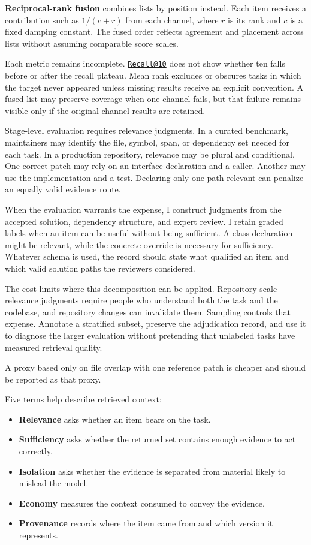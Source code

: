 \textbf{Reciprocal-rank fusion} combines lists by position instead. Each item receives a contribution such as \(1/(c+r)\) from each channel, where \(r\) is its rank and \(c\) is a fixed damping constant. The fused order reflects agreement and placement across lists without assuming comparable score scales.

Each metric remains incomplete. \href{mailto:Recall@10}{\nolinkurl{Recall@10}} does not show whether ten falls before or after the recall plateau. Mean rank excludes or obscures tasks in which the target never appeared unless missing results receive an explicit convention. A fused list may preserve coverage when one channel fails, but that failure remains visible only if the original channel results are retained.

Stage-level evaluation requires relevance judgments. In a curated benchmark, maintainers may identify the file, symbol, span, or dependency set needed for each task. In a production repository, relevance may be plural and conditional. One correct patch may rely on an interface declaration and a caller. Another may use the implementation and a test. Declaring only one path relevant can penalize an equally valid evidence route.

When the evaluation warrants the expense, I construct judgments from the accepted solution, dependency structure, and expert review. I retain graded labels when an item can be useful without being sufficient. A class declaration might be relevant, while the concrete override is necessary for sufficiency. Whatever schema is used, the record should state what qualified an item and which valid solution paths the reviewers considered.

The cost limits where this decomposition can be applied. Repository-scale relevance judgments require people who understand both the task and the codebase, and repository changes can invalidate them. Sampling controls that expense. Annotate a stratified subset, preserve the adjudication record, and use it to diagnose the larger evaluation without pretending that unlabeled tasks have measured retrieval quality.

A proxy based only on file overlap with one reference patch is cheaper and should be reported as that proxy.

Five terms help describe retrieved context:

\begin{itemize}
\tightlist
\item
  \textbf{Relevance} asks whether an item bears on the task.
\item
  \textbf{Sufficiency} asks whether the returned set contains enough evidence to act correctly.
\item
  \textbf{Isolation} asks whether the evidence is separated from material likely to mislead the model.
\item
  \textbf{Economy} measures the context consumed to convey the evidence.
\item
  \textbf{Provenance} records where the item came from and which version it represents.
\end{itemize}

